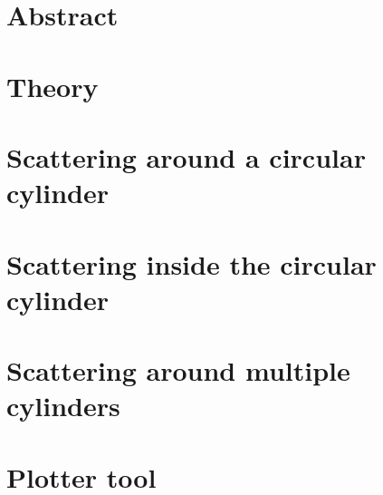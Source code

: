 \documentclass{report}
\begin{document}
    
    

\chapter*{Abstract} 
    

\chapter{Theory}
    

\chapter{Scattering around a circular cylinder}\label{chp:outside}
    

\chapter{Scattering inside the circular cylinder}\label{chp:inside}
  

\chapter{Scattering around multiple cylinders}
  

\chapter{Plotter tool}
    

\printbibliography
{}
\end{document}
